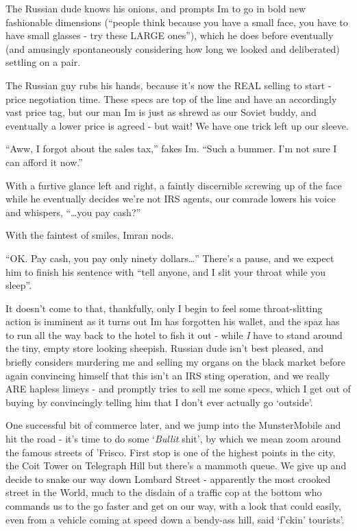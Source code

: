 \documentclass[a5paper,10pt,titlepage,draft]{book}
\begin{document}
The Russian dude knows his onions, and prompts Im to go in bold new fashionable dimensions (``people think because you have a small face, you have to have small glasses - try these LARGE ones''), which he does before eventually (and amusingly spontaneously considering how long we looked and deliberated) settling on a pair.

The Russian guy rubs his hands, because it's now the REAL selling to start - price negotiation time.  These specs are top of the line and have an accordingly vast price tag, but our man Im is just as shrewd as our Soviet buddy, and eventually a lower price is agreed - but wait!  We have one trick left up our sleeve.

``Aww, I forgot about the sales tax,'' fakes Im.  ``Such a bummer.  I'm not sure I can afford it now.''

With a furtive glance left and right, a faintly discernible screwing up of the face while he eventually decides we're not IRS agents, our comrade lowers his voice and whispers, ``\ldots you pay cash?''

With the faintest of smiles, Imran nods.

``OK.  Pay cash, you pay only ninety dollars\ldots'' There's a pause, and we expect him to finish his sentence with ``tell anyone, and I slit your throat while you sleep''.

It doesn't come to that, thankfully, only I begin to feel some throat-slitting action is imminent as it turns out Im has forgotten his wallet, and the spaz has to run all the way back to the hotel to fish it out - while \emph{I} have to stand around the tiny, empty store looking sheepish.  Russian dude isn't best pleased, and briefly considers murdering me and selling my organs on the black market before again convincing himself that this isn't an IRS sting operation, and we really ARE hapless limeys - and promptly tries to sell me some specs, which I get out of buying by convincingly telling him that I don't ever actually go `outside'.

One successful bit of commerce later, and we jump into the MunsterMobile and hit the road - it's time to do some `\emph{Bullit} shit', by which we mean zoom around the famous streets of 'Frisco.  First stop is one of the highest points in the city, the Coit Tower on Telegraph Hill but there's a mammoth queue.  We give up and decide to snake our way down Lombard Street - apparently the most crooked street in the World, much to the disdain of a traffic cop at the bottom who commands us to the go faster and get on our way, with a look that could easily, even from a vehicle coming at speed down a bendy-ass hill, said `f'ckin' tourists'.
\end{document}
